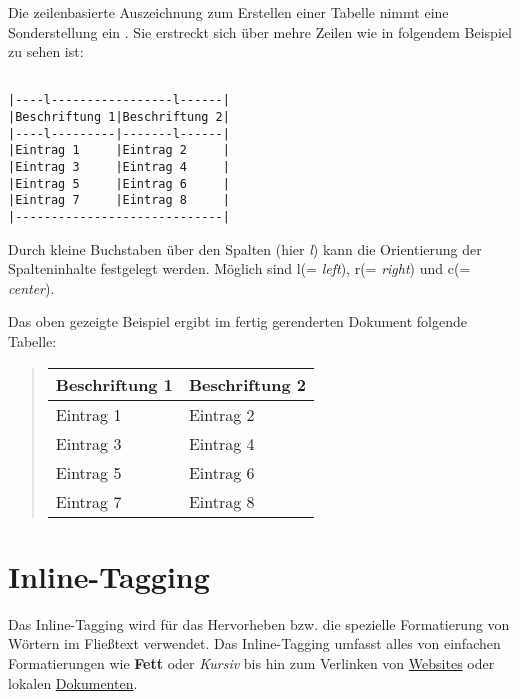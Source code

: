 \documentclass[%
oneside,                 %
final,                   %
chapterprefix=true,      %
open=right,              %
10pt]{book}
\begin{document}
\noindent
Die zeilenbasierte Auszeichnung zum Erstellen einer Tabelle nimmt eine Sonderstellung ein . Sie erstreckt sich über mehre Zeilen wie in folgendem Beispiel zu sehen ist:
\begin{verbatim}

|----l-----------------l------|
|Beschriftung 1|Beschriftung 2|
|----l---------|-------l------|
|Eintrag 1     |Eintrag 2     |
|Eintrag 3     |Eintrag 4     |
|Eintrag 5     |Eintrag 6     |
|Eintrag 7     |Eintrag 8     |
|-----------------------------|

\end{verbatim}
Durch kleine Buchstaben über den Spalten (hier \emph{l}) kann die Orientierung der Spalteninhalte festgelegt werden. Möglich sind l(= \emph{left}), r(= \emph{right}) und c(= \emph{center}).\\


\vspace{3mm}


Das oben gezeigte Beispiel ergibt im fertig gerenderten Dokument folgende Tabelle:


\begin{quote}
\begin{tabular}{ll}
\hline
\multicolumn{1}{l}{ Beschriftung 1 } & \multicolumn{1}{l}{ Beschriftung 2 } \\
\hline
Eintrag 1      & Eintrag 2      \\
Eintrag 3      & Eintrag 4      \\
Eintrag 5      & Eintrag 6      \\
Eintrag 7      & Eintrag 8      \\
\hline
\end{tabular}
\end{quote}

\noindent
\section{Inline-Tagging}
Das Inline-Tagging wird für das Hervorheben bzw. die spezielle Formatierung von Wörtern im Fließtext verwendet. Das Inline-Tagging umfasst alles von einfachen Formatierungen wie \textbf{Fett} oder \emph{Kursiv} bis hin zum Verlinken von \href{{https://github.com/hplgit/doconce}}{Websites} oder lokalen \href{{tools/manual.pdf}}{\textcolor{darkblue2}{Dokumenten}}.


\vspace{3mm}
\end{document}
